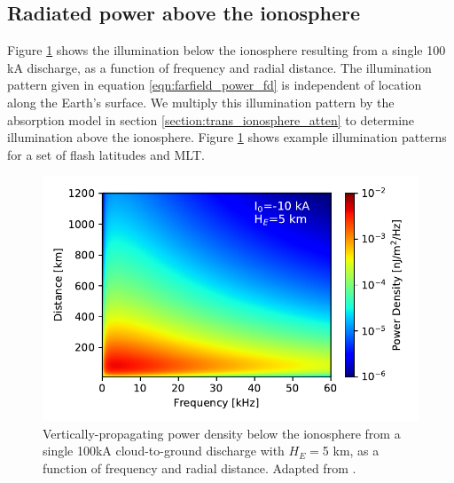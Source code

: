 \subsection{Radiated power above the ionosphere}
Figure \ref{fig:illumination} shows the illumination below the ionosphere resulting from a single 100 kA discharge, as a function of frequency and radial distance. The illumination pattern given in equation \eqref{eqn:farfield_power_fd} is independent of location along the Earth's surface. We multiply this illumination pattern by the absorption model in section \ref{section:trans_ionosphere_atten} to determine illumination above the ionosphere. Figure \ref{fig:illumination} shows example illumination patterns for a set of flash latitudes and MLT.

\begin{figure}[h!]
\begin{center}
\includegraphics{figures/power_scaling_below_ionosphere.pdf}
\caption[Illumination pattern below the ionosphere]{Vertically-propagating power density below the ionosphere from a single 100kA cloud-to-ground discharge with $H_E=$5 km, as a function of frequency and radial distance. Adapted from \cite{Marshall2011}.}
\label{fig:illumination}
\end{center}
\end{figure}

